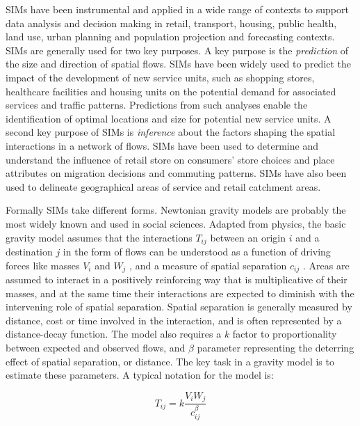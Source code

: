 \documentclass[11pt,letterpaper]{article}
\begin{document}
SIMs have been instrumental and applied in a wide range of contexts to support data analysis and decision making in retail, transport, housing, public health, land use, urban planning and population projection and forecasting contexts.
SIMs are generally used for two key purposes.
A key purpose is the \emph{prediction} of the size and direction of spatial flows.
SIMs have been widely used to predict the impact of the development of new service units, such as shopping stores, healthcare facilities and housing units on the potential demand for associated services and traffic patterns.
Predictions from such analyses enable the identification of optimal locations and size for potential new service units.
A second key purpose of SIMs is \emph{inference} about the factors shaping the spatial interactions in a network of flows.
SIMs have been used to determine and understand the influence of retail store on consumers' store choices and place attributes on migration decisions and commuting patterns.
SIMs have also been used to delineate geographical areas of service and retail catchment areas.

Formally SIMs take different forms.
Newtonian gravity models are probably the most widely known and used in social sciences.
Adapted from physics, the basic gravity model assumes that the interactions \(T_{i j}\) between an origin \(i\) and a destination \(j\) in the form of flows can be understood as a function of driving forces like masses \(V_{i}\) and \(W_{j}\) , and a measure of spatial separation \(c_{ij}\) .
Areas are assumed to interact in a positively reinforcing way that is multiplicative of their masses, and at the same time their interactions are expected to diminish with the intervening role of spatial separation.
Spatial separation is generally measured by distance, cost or time involved in the interaction, and is often represented by a distance-decay function.
The model also requires a \(k\) factor to proportionality between expected and observed flows, and \(\beta\) parameter representing the deterring effect of spatial separation, or distance.
The key task in a gravity model is to estimate these parameters.
A typical notation for the model is:

\[
T_{i j}=k \frac{V_{i} W_{j}}{c_{i j}^{\beta}}
\]
\end{document}
